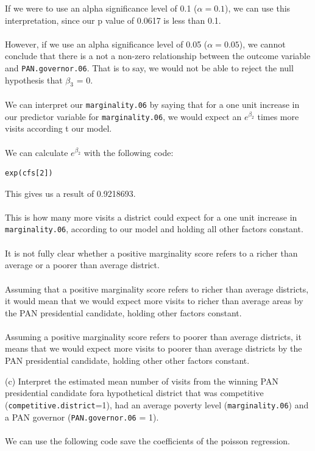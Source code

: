 \documentclass[12pt,letterpaper]{article}
\begin{document}
\noindent 
If we were to use an alpha significance level of 0.1 ($\alpha = 0.1$), we can use this interpretation, since our p value of 0.0617 is less than 0.1.
\\\\

\noindent However, if we use an alpha significance level of 0.05 ($\alpha = 0.05$), we cannot conclude that there is a not a non-zero relationship between the outcome variable and \texttt{PAN.governor.06}. That is to say, we would not be able to reject the null hypothesis that $\beta_3$ = 0.
\\\\

\noindent We can interpret our \texttt{marginality.06} by saying that for a one unit increase in our predictor variable for \texttt{marginality.06}, we would expect an $e^{\beta_2}$ times more visits according t our model.
\\\\

\noindent We can calculate  $e^{\beta_2}$ with the following code:

\begin{lstlisting}
exp(cfs[2])
\end{lstlisting}

\noindent This gives us a result of 0.9218693. 
\\\\
This is how many more visits a district could expect for a one unit increase in \texttt{marginality.06}, according to our model and holding all other factors constant.
\\\\
It is not fully clear whether a positive marginality score refers to a richer than average or a poorer than average district.
\\\\
Assuming that a positive marginality score refers to richer than average districts, it would mean that we would expect more visits to richer than average areas by the PAN presidential candidate, holding other factors constant.
\\\\
Assuming a positive marginality score refers to poorer than average districts, it means that we would expect more visits to poorer than average districts by the PAN presidential candidate, holding other other factors constant.

\pagebreak
\noindent (c) Interpret the estimated mean number of visits from the winning PAN presidential candidate fora hypothetical district that was competitive (\texttt{competitive.district}=1), had an average poverty level (\texttt{marginality.06}) and a PAN governor (\texttt{PAN.governor.06} = 1).
\\\\
\noindent We can use the following code save the coefficients of the poisson regression. 
\end{document}
